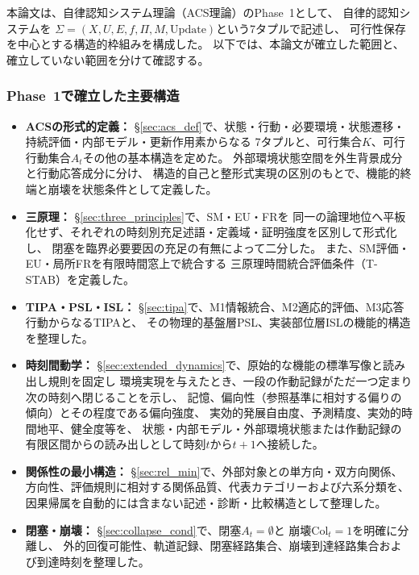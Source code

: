 本論文は、自律認知システム理論（ACS理論）のPhase~1として、
自律的認知システムを
$\Sigma=(X,U,E,f,\Pi,M,\mathrm{Update})$という7タプルで記述し、
可行性保存を中心とする構造的枠組みを構成した。
以下では、本論文が確立した範囲と、確立していない範囲を分けて確認する。

\subsubsection*{Phase~1で確立した主要構造}
\label{subsubsec:core_results}

\begin{itemize}
  \item \textbf{ACSの形式的定義：}
  \S\ref{sec:acs_def}で、状態・行動・必要環境・状態遷移・持続評価・内部モデル・更新作用素からなる
  7タプルと、可行集合$K$、可行行動集合$A_t$その他の基本構造を定めた。
  外部環境状態空間を外生背景成分と行動応答成分に分け、
  構造的自己と整形式実現の区別のもとで、機能的終端と崩壊を状態条件として定義した。

  \item \textbf{三原理：}
  \S\ref{sec:three_principles}で、SM・EU・FRを
  同一の論理地位へ平板化せず、それぞれの時刻別充足述語・定義域・証明強度を区別して形式化し、
  閉塞を臨界必要要因の充足の有無によって二分した。
  また、SM評価・EU・局所FRを有限時間窓上で統合する
  三原理時間統合評価条件（T-STAB）を定義した。

  \item \textbf{TIPA・PSL・ISL：}
  \S\ref{sec:tipa}で、M1情報統合、M2適応的評価、M3応答行動からなるTIPAと、
  その物理的基盤層PSL、実装部位層ISLの機能的構造を整理した。

  \item \textbf{時刻間動学：}
  \S\ref{sec:extended_dynamics}で、原始的な機能の標準写像と読み出し規則を固定し
  環境実現を与えたとき、一段の作動記録がただ一つ定まり次の時刻へ閉じることを示し、
  記憶、偏向性（参照基準に相対する偏りの傾向）とその程度である偏向強度、
  実効的発展自由度、予測精度、実効的時間地平、健全度等を、
  状態・内部モデル・外部環境状態または作動記録の有限区間からの読み出しとして時刻$t$から$t+1$へ接続した。

  \item \textbf{関係性の最小構造：}
  \S\ref{sec:rel_min}で、外部対象との単方向・双方向関係、方向性、評価規則に相対する関係品質、代表カテゴリーおよび六系分類を、
  因果帰属を自動的には含まない記述・診断・比較構造として整理した。

  \item \textbf{閉塞・崩壊：}
  \S\ref{sec:collapse_cond}で、閉塞$A_t=\emptyset$と
  崩壊$\mathrm{Col}_t=1$を明確に分離し、
  外的回復可能性、軌道記録、閉塞経路集合、崩壊到達経路集合および到達時刻を整理した。


\end{itemize}
